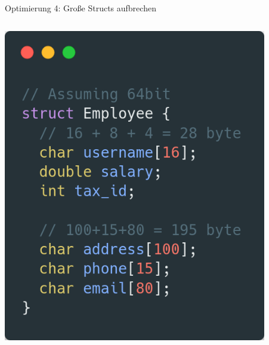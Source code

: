 \documentclass{beamer}
\begin{document}
\begin{frame}{Optimierung 4: Gro\ss{}e Structs aufbrechen}
  \begin{columns}
    \begin{column}{0.5\textwidth}
  \centerline{\includegraphics[width=0.9\textwidth]{breakup1.png}}
    \end{column}
    \pause
    \begin{column}{0.5\textwidth}

\end{column}
\end{columns}
\end{frame}
\end{document}
